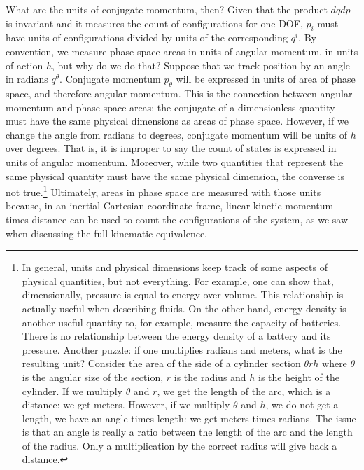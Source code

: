 What are the units of conjugate momentum, then? Given that the product $dq dp$ is invariant and it measures the count of configurations for one DOF, $p_i$ must have units of configurations divided by units of the corresponding $q^i$. By convention, we measure phase-space areas in units of angular momentum, in units of action $h$, but why do we do that? Suppose that we track position by an angle in radians $q^\theta$. Conjugate momentum $p_\theta$ will be expressed in units of area of phase space, and therefore angular momentum. This is the connection between angular momentum and phase-space areas: the conjugate of a dimensionless quantity must have the same physical dimensions as areas of phase space. However, if we change the angle from radians to degrees, conjugate momentum will be units of $h$ over degrees. That is, it is improper to say the count of states is expressed in units of angular momentum. Moreover, while two quantities that represent the same physical quantity must have the same physical dimension, the converse is not true.\footnote{In general, units and physical dimensions keep track of some aspects of physical quantities, but not everything. For example, one can show that, dimensionally, pressure is equal to energy over volume. This relationship is actually useful when describing fluids. On the other hand, energy density is another useful quantity to, for example, measure the capacity of batteries. There is no relationship between the energy density of a battery and its pressure. Another puzzle: if one multiplies radians and meters, what is the resulting unit? Consider the area of the side of a cylinder section $\theta r h$ where $\theta$ is the angular size of the section, $r$ is the radius and $h$ is the height of the cylinder. If we multiply $\theta$ and $r$, we get the length of the arc, which is a distance: we get meters. However, if we multiply $\theta$ and $h$, we do not get a length, we have an angle times length: we get meters times radians. The issue is that an angle is really a ratio between the length of the arc and the length of the radius. Only a multiplication by the correct radius will give back a distance.} Ultimately, areas in phase space are measured with those units because, in an inertial Cartesian coordinate frame, linear kinetic momentum times distance can be used to count the configurations of the system, as we saw when discussing the full kinematic equivalence.

